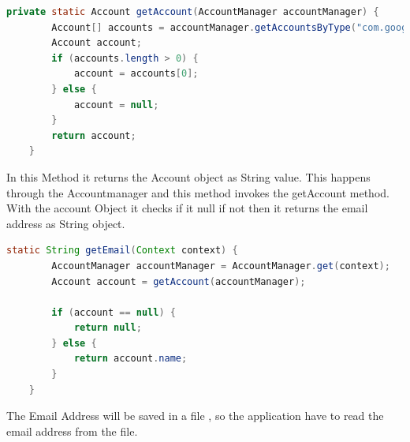 \begin{lstlisting}[language=java, caption= Accounts]
	private static Account getAccount(AccountManager accountManager) {
        Account[] accounts = accountManager.getAccountsByType("com.google");
        Account account;
        if (accounts.length > 0) {
            account = accounts[0];     
        } else {
            account = null;
        }
        return account;
    }

\end{lstlisting}

In this  Method it returns the Account object as String value. This happens through the Accountmanager and this method invokes the getAccount method. With the account Object it checks if it null if not then it returns the email address as String object.


\begin{lstlisting}[language=java, caption= Email]
static String getEmail(Context context) {
        AccountManager accountManager = AccountManager.get(context); 
        Account account = getAccount(accountManager);

        if (account == null) {
            return null;
        } else {
            return account.name;
        }
    }

\end{lstlisting}
The Email Address will be saved in a file , so the application  have to read the email address from the file. 